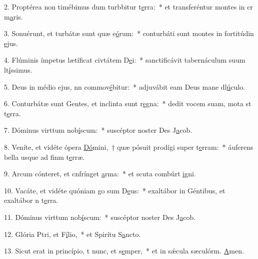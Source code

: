 2. Proptérea non timébimus dum turbbitur t\uline{e}rra:~* et transferéntur montes in cr m\uline{a}ris.\par 
3. Sonuérunt, et turbátæ sunt quæ e\uline{ó}rum:~* conturbáti sunt montes in fortitúdin \uline{e}jus.\par 
4. Flúminis ímpetus lætíficat civtátem D\uline{e}i:~* sanctificávit tabernáculum suum lt\uline{í}ssimus.\par 
5. Deus in médio ejus, nn commov\uline{é}bitur:~* adjuvábit eam Deus mane dl\uline{ú}culo.\par 
6. Conturbátæ sunt Gentes, et inclinta sunt r\uline{e}gna:~* dedit vocem suam, mota st t\uline{e}rra.\par 
7. Dóminus virttum nob\uline{í}scum:~* suscéptor noster Des J\uline{a}cob.\par 
8. Veníte, et vidéte ópera \uline{Dó}mini,~† quæ pósuit prodígi super t\uline{e}rram:~* áuferens bella usque ad finm t\uline{e}rræ.\par 
9. Arcum cónteret, et cnfrínget \uline{a}rma:~* et scuta combúrt \uline{i}gni.\par 
10. Vacáte, et vidéte quóniam go sum D\uline{e}us:~* exaltábor in Géntibus, et exaltábor n t\uline{e}rra.\par 
11. Dóminus virttum nob\uline{í}scum:~* suscéptor noster Des J\uline{a}cob.\par 
12. Glória Ptri, et F\uline{í}lio,~* et Spirítu S\uline{a}ncto.\par 
13. Sicut erat in princípio, t nunc, et s\uline{e}mper,~* et in sǽcula sæculórm. \uline{A}men.\par 
